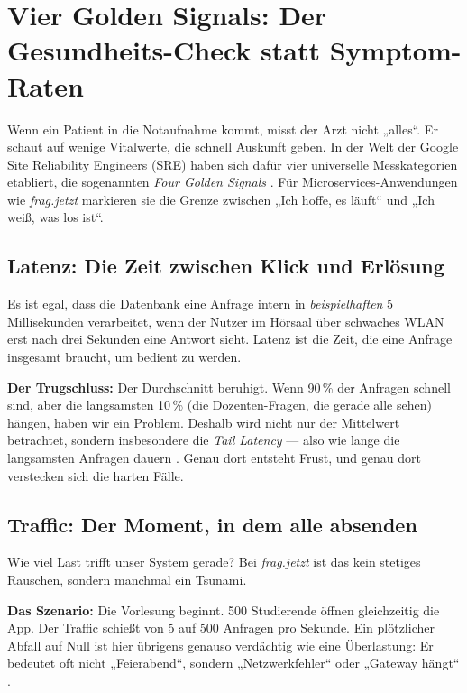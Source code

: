 \section{Vier Golden Signals: Der Gesundheits-Check statt Symptom-Raten}

Wenn ein Patient in die Notaufnahme kommt, misst der Arzt nicht „alles“. Er schaut auf wenige Vitalwerte, die schnell Auskunft geben. In der Welt der Google Site Reliability Engineers (SRE) haben sich dafür vier universelle Messkategorien etabliert, die sogenannten \emph{Four Golden Signals} \cite{ewaschukMonitoringDistributedSystems}. Für Microservices-Anwendungen wie \emph{frag.jetzt} markieren sie die Grenze zwischen „Ich hoffe, es läuft“ und „Ich weiß, was los ist“.

\subsection{Latenz: Die Zeit zwischen Klick und Erlösung}

Es ist egal, dass die Datenbank eine Anfrage intern in \emph{beispielhaften} 5 Millisekunden verarbeitet, wenn der Nutzer im Hörsaal über schwaches WLAN erst nach drei Sekunden eine Antwort sieht. Latenz ist die Zeit, die eine Anfrage insgesamt braucht, um bedient zu werden.

\textbf{Der Trugschluss:} Der Durchschnitt beruhigt. Wenn 90\,\% der Anfragen schnell sind, aber die langsamsten 10\,\% (die Dozenten-Fragen, die gerade alle sehen) hängen, haben wir ein Problem. Deshalb wird nicht nur der Mittelwert betrachtet, sondern insbesondere die \emph{Tail Latency} --- also wie lange die langsamsten Anfragen dauern \cite{abieba2025advanced}. Genau dort entsteht Frust, und genau dort verstecken sich die harten Fälle.

\subsection{Traffic: Der Moment, in dem alle absenden}

Wie viel Last trifft unser System gerade? Bei \emph{frag.jetzt} ist das kein stetiges Rauschen, sondern manchmal ein Tsunami.

\textbf{Das Szenario:} Die Vorlesung beginnt. 500 Studierende öffnen gleichzeitig die App. Der Traffic schießt von 5 auf 500 Anfragen pro Sekunde. Ein plötzlicher Abfall auf Null ist hier übrigens genauso verdächtig wie eine Überlastung: Er bedeutet oft nicht „Feierabend“, sondern „Netzwerkfehler“ oder „Gateway hängt“ \cite{giamattei2024monitoring}.

